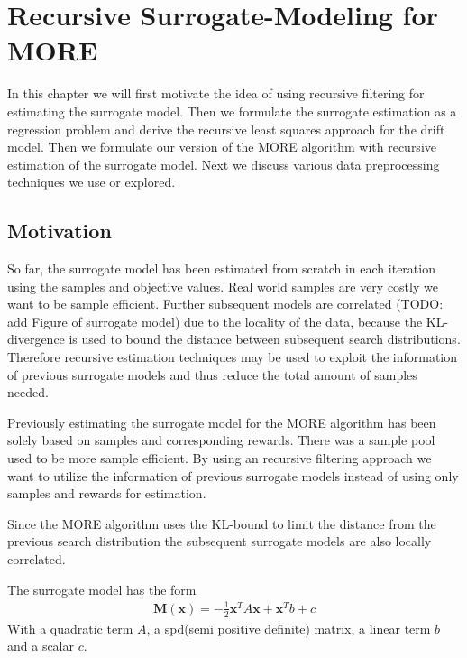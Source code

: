 
\chapter{Recursive Surrogate-Modeling for MORE}
In this chapter we will first motivate the idea of using recursive filtering
for estimating the surrogate model. Then we formulate the surrogate estimation
as a regression problem and derive the recursive
least squares approach for the drift model.
Then we formulate our version of the MORE algorithm with
recursive estimation of the surrogate model.
Next we discuss various data preprocessing techniques we use or explored.

\section{Motivation}
So far, the surrogate model has been estimated from scratch in each
iteration using the samples and objective values. 
Real world samples are very costly we want to be sample efficient.
Further subsequent models are correlated
(TODO: add Figure of surrogate model) due to the locality of the
data, because the KL-divergence is used to bound the distance between
subsequent search distributions. Therefore recursive estimation
techniques may be used to exploit the information of previous
surrogate models and thus reduce the total amount of samples needed.

Previously estimating the surrogate model for the MORE algorithm has been solely based
on samples and corresponding rewards. There was a sample pool used to be more
sample efficient. By using an recursive filtering approach
we want to utilize the information of previous surrogate models instead
of using only samples and rewards for estimation.

Since the MORE algorithm uses the KL-bound to limit the distance from the previous search
distribution the subsequent surrogate models are also locally correlated.

The surrogate model has the form
\begin{align}
  \label{surrogate}
  \mathbf{M}(\mathbf{x}) = -\frac{1}{2} \mathbf{x}^T A \mathbf{x}
  + \mathbf{x}^T b + c 
\end{align}
With a quadratic term $A$, a spd(semi positive definite) matrix, a
linear term $b$ and a scalar $c$.




